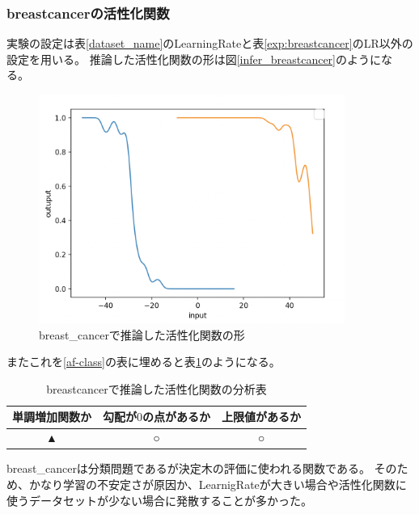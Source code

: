 \subsubsection{breastcancerの活性化関数}
実験の設定は表\ref{dataset_name}のLearningRateと表\ref{exp:breastcancer}のLR以外の設定を用いる。
推論した活性化関数の形は図\ref{infer_breastcancer}のようになる。
\begin{figure}[hbtp]
    \begin{center}
        \includegraphics[width=10cm]{asset/breastcancer-0.01.png}
            \caption{breast\_cancerで推論した活性化関数の形}
            \label{ifer_breastcancer}
    \end{center}
\end{figure}

またこれを\ref{af-class}の表に埋めると表\ref{anal_breastcancer}のようになる。
\begin{table}[htbp]
    \begin{center}
        \caption{breastcancerで推論した活性化関数の分析表}
        \label{anal_breastcancer}
        \vspace{2mm} 
        \begin{tabular}{ |c|c|c| }
        単調増加関数か & 勾配が$ 0 $の点があるか & 上限値があるか   \\
        \hline
        ▲ & ○ & ○   \\
        \end{tabular}
    \end{center}
\end{table}


breast\_cancerは分類問題であるが決定木の評価に使われる関数である。
そのため、かなり学習の不安定さが原因か、LearnigRateが大きい場合や活性化関数に使うデータセットが少ない場合に発散することが多かった。











